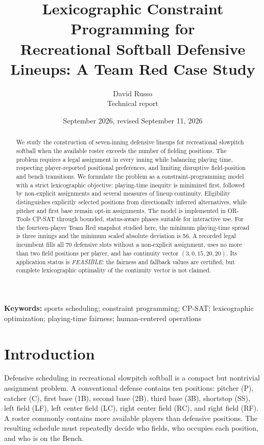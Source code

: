 \documentclass[11pt]{article}
\title{\vspace{-1.25cm}\textbf{Lexicographic Constraint Programming for\\
Recreational Softball Defensive Lineups: A Team Red Case Study}}
\author{David Russo\\\small Technical report}
\date{September 2026, revised September 11, 2026}
\begin{document}
\maketitle
\vspace{-0.75cm}

\begin{abstract}
We study the construction of seven-inning defensive lineups for recreational
slowpitch softball when the available roster exceeds the number of fielding
positions. The problem requires a legal assignment in every inning while
balancing playing time, respecting player-reported positional preferences, and
limiting disruptive field-position and bench transitions. We formulate the
problem as a constraint-programming model with a strict lexicographic
objective: playing-time inequity is minimized first, followed by non-explicit
assignments and several measures of lineup continuity. Eligibility distinguishes
explicitly selected positions from directionally inferred alternatives, while
pitcher and first base remain opt-in assignments. The model is implemented in
OR-Tools CP-SAT through bounded, status-aware phases suitable for interactive
use. For the fourteen-player Team Red snapshot studied here, the minimum
playing-time spread is three innings and the minimum scaled absolute deviation
is 56. A recorded legal incumbent fills all 70 defensive slots without a
non-explicit assignment, uses no more than two field positions per player, and
has continuity vector $(3,0,15,20,20)$. Its application status is
\emph{FEASIBLE}: the fairness and fallback values are certified, but complete
lexicographic optimality of the continuity vector is not claimed.
\end{abstract}

\textbf{Keywords:} sports scheduling; constraint programming; CP-SAT;
lexicographic optimization; playing-time fairness; human-centered operations

\section{Introduction}

Defensive scheduling in recreational slowpitch softball is a compact but
nontrivial assignment problem. A conventional defense contains ten positions:
pitcher (P), catcher (C), first base (1B), second base (2B), third base (3B),
shortstop (SS), left field (LF), left center field (LC), right center field
(RC), and right field (RF). A roster commonly contains more available players
than defensive positions. The resulting schedule must repeatedly decide who
fields, who occupies each position, and who is on the Bench.
\end{document}

